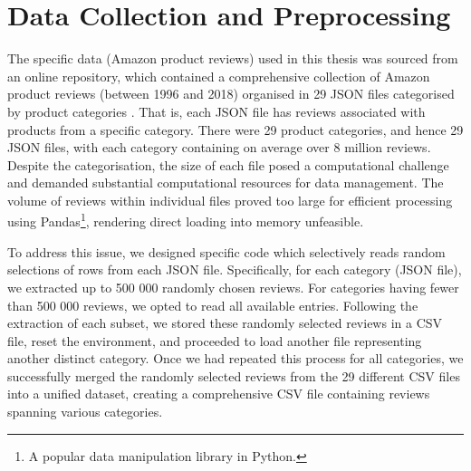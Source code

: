  
\section{Data Collection and Preprocessing}
\label{sec:3 Data Collection and Preprocessing}


The specific data (Amazon product reviews) used in this thesis was sourced from an online repository, which contained a comprehensive collection of Amazon product reviews (between 1996 and 2018) organised in 29 JSON files categorised by product categories \cite{pasricha2018translation}. That is, each JSON file has reviews associated with products from a specific category. There were 29 product categories, and hence 29 JSON files, with each category containing on average over 8 million reviews. Despite the categorisation, the size of each file posed a computational challenge and demanded substantial computational resources for data management. The volume of reviews within individual files proved too large for efficient processing using Pandas\footnote{A popular data manipulation library in Python.}, rendering direct loading into memory unfeasible.

To address this issue, we designed specific code which selectively reads random selections of rows from each JSON file. Specifically, for each category (JSON file), we extracted up to 500 000 randomly chosen reviews. For categories having fewer than 500 000 reviews, we opted to read all available entries. Following the extraction of each subset, we stored these randomly selected reviews in a CSV file, reset the environment, and proceeded to load another file representing another distinct category. Once we had repeated this process for all categories, we successfully merged the randomly selected reviews from the 29 different CSV files into a unified dataset, creating a comprehensive CSV file containing reviews spanning various categories. 

